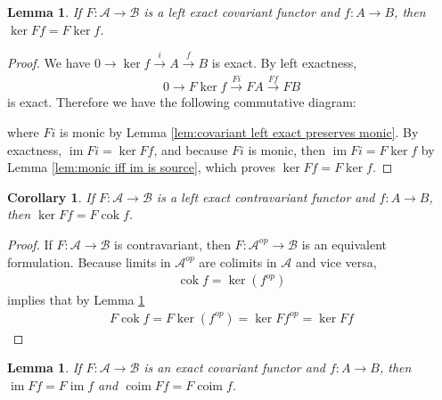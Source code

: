 \documentclass{article}
\newcommand{\fA}{\mathscr{A}}
\newcommand{\fB}{\mathscr{B}}
\DeclareMathOperator{\im}{im}
\DeclareMathOperator{\coim}{coim}
\DeclareMathOperator{\cok}{cok}
\newtheorem{corollary}{Corollary}[theorem]
\newtheorem{lemma}[theorem]{Lemma}
\begin{document}
\begin{lemma}\label{lem:covariant left exact commutes with ker}
    If $F:\fA \to \fB$ is a left exact covariant functor and $f:A\to B$, then $\ker Ff=F\ker f$.
\end{lemma}
\begin{proof}
    We have $0\rightarrow \ker f\xrightarrow{i} A\xrightarrow{f}B$ is exact. By left exactness,
    \begin{align*}
        0\rightarrow F\ker f \xrightarrow{Fi} FA \xrightarrow{Ff} FB
    \end{align*}
    is exact. Therefore we have the following commutative diagram:
    \begin{center}
    \end{center}
    where $Fi$ is monic by Lemma \ref{lem:covariant left exact preserves monic}. By exactness, $\im Fi=\ker Ff$, and because $Fi$ is monic, then $\im Fi=F\ker f$ by Lemma \ref{lem:monic iff im is source}, which proves $\ker Ff=F\ker f$.
\end{proof}
\begin{corollary}\label{cor:contravariant left exact and cok to ker}
    If $F:\fA \to \fB$ is a left exact contravariant functor and $f:A\to B$, then $\ker Ff=F\cok f$.
\end{corollary}
\begin{proof}
    If $F:\fA \to \fB$ is contravariant, then $F:\fA^{op}\to \fB$ is an equivalent formulation. Because limits in $\fA^{op}$ are colimits in $\fA$ and vice versa,
    \begin{align*}
        \cok f=\ker (f^{op})
    \end{align*}
    implies that by Lemma \ref{lem:covariant left exact commutes with ker}
    \begin{align*}
        F\cok f=F\ker (f^{op})=\ker Ff^{op}=\ker Ff
    \end{align*}
\end{proof}
\begin{lemma}\label{lem:covariant exact and commutes with im and coim}
    If $F:\fA \to \fB$ is an exact covariant functor and $f:A\to B$, then $\im Ff=F\im f$ and $\coim Ff=F\coim f$.
\end{lemma}
\end{document}
